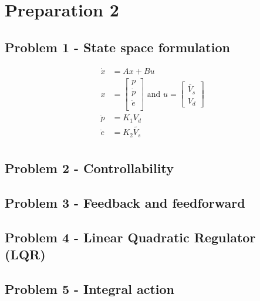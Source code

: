 \section{Preparation 2}


\subsection{Problem 1 - State space formulation}
\begin{align*}
    \dot{x}&=Ax+Bu \\
    x&=
    \begin{bmatrix}
        p \\
        \dot{p} \\
        \dot{e} \\
    \end{bmatrix}
    \text{ and } u=
    \begin{bmatrix}
        \tilde{V_s} \\
        V_d
    \end{bmatrix}\\
    \ddot{p}&=K_1 V_d \\
    \ddot{e}&=K_2 \tilde{V_s}\\
\end{align*}
\subsection{Problem 2 - Controllability}
\subsection{Problem 3 - Feedback and feedforward}
\subsection{Problem 4 - Linear Quadratic Regulator (LQR)}
\subsection{Problem 5 - Integral action}
